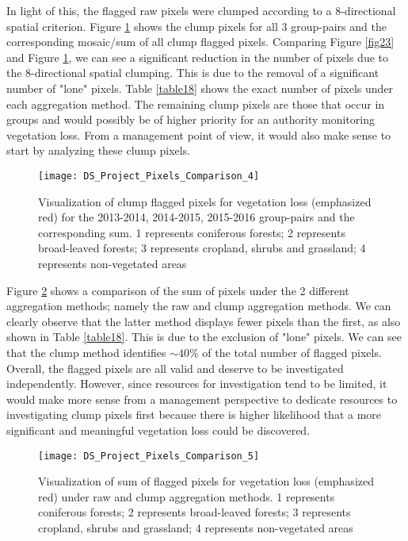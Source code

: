 \justify
In light of this, the flagged raw pixels were clumped according to a 8-directional spatial criterion. Figure \ref{fig24} shows the clump pixels for all 3 group-pairs and the corresponding mosaic/sum of all clump flagged pixels. Comparing Figure \ref{fig23} and Figure \ref{fig24}, we can see a significant reduction in the number of pixels due to the 8-directional spatial clumping. This is due to the removal of a significant number of "lone" pixels. Table \ref{table18} shows the exact number of pixels under each aggregation method. The remaining clump pixels are those that occur in groups and would possibly be of higher priority for an authority monitoring vegetation loss. From a management point of view, it would also make sense to start by analyzing these clump pixels.

\begin{figure}[H]
	\centering
	\texttt{[image: DS\_Project\_Pixels\_Comparison\_4]}
	\caption[Visualization of clump flagged pixels for vegetation loss (emphasized red) for the 2013-2014, 2014-2015, 2015-2016 group-pairs and the corresponding sum]{Visualization of clump flagged pixels for vegetation loss (emphasized red) for the 2013-2014, 2014-2015, 2015-2016 group-pairs and the corresponding sum. 1 represents coniferous forests; 2 represents broad-leaved forests; 3 represents cropland, shrubs and grassland; 4 represents non-vegetated areas}
	\label{fig24}
\end{figure}

\justify
Figure \ref{fig25} shows a comparison of the sum of pixels under the 2 different aggregation methods; namely the raw and clump aggregation methods. We can clearly observe that the latter method displays fewer pixels than the first, as also shown in Table \ref{table18}. This is due to the exclusion of "lone" pixels. We can see that the clump method identifies $\sim40\%$ of the total number of flagged pixels. Overall, the flagged pixels are all valid and deserve to be investigated independently. However, since resources for investigation tend to be limited, it would make more sense from a management perspective to dedicate resources to investigating clump pixels first because there is higher likelihood that a more significant and meaningful vegetation loss could be discovered.

\begin{figure}[H]
	\centering
	\texttt{[image: DS\_Project\_Pixels\_Comparison\_5]}
	\caption[Visualization of sum of flagged pixels for vegetation loss (emphasized red) under raw and clump aggregation methods]{Visualization of sum of flagged pixels for vegetation loss (emphasized red) under raw and clump aggregation methods. 1 represents coniferous forests; 2 represents broad-leaved forests; 3 represents cropland, shrubs and grassland; 4 represents non-vegetated areas}
	\label{fig25}
\end{figure}

